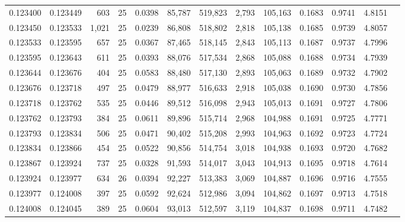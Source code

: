 \begin{tabular}{rrrrrrrrrrrrr}
0.123400 & 0.123449 &   603 &  25 &                                     0.0398 &  85,787 & 519,823 &   2,793 & 105,163 & 0.1683 & 0.9741 & 4.8151 \\
0.123450 & 0.123533 & 1,021 &  25 &                                     0.0239 &  86,808 & 518,802 &   2,818 & 105,138 & 0.1685 & 0.9739 & 4.8057 \\
0.123533 & 0.123595 &   657 &  25 &                                     0.0367 &  87,465 & 518,145 &   2,843 & 105,113 & 0.1687 & 0.9737 & 4.7996 \\
0.123595 & 0.123643 &   611 &  25 &                                     0.0393 &  88,076 & 517,534 &   2,868 & 105,088 & 0.1688 & 0.9734 & 4.7939 \\
0.123644 & 0.123676 &   404 &  25 &                                     0.0583 &  88,480 & 517,130 &   2,893 & 105,063 & 0.1689 & 0.9732 & 4.7902 \\
0.123676 & 0.123718 &   497 &  25 &                                     0.0479 &  88,977 & 516,633 &   2,918 & 105,038 & 0.1690 & 0.9730 & 4.7856 \\
0.123718 & 0.123762 &   535 &  25 &                                     0.0446 &  89,512 & 516,098 &   2,943 & 105,013 & 0.1691 & 0.9727 & 4.7806 \\
0.123762 & 0.123793 &   384 &  25 &                                     0.0611 &  89,896 & 515,714 &   2,968 & 104,988 & 0.1691 & 0.9725 & 4.7771 \\
0.123793 & 0.123834 &   506 &  25 &                                     0.0471 &  90,402 & 515,208 &   2,993 & 104,963 & 0.1692 & 0.9723 & 4.7724 \\
0.123834 & 0.123866 &   454 &  25 &                                     0.0522 &  90,856 & 514,754 &   3,018 & 104,938 & 0.1693 & 0.9720 & 4.7682 \\
0.123867 & 0.123924 &   737 &  25 &                                     0.0328 &  91,593 & 514,017 &   3,043 & 104,913 & 0.1695 & 0.9718 & 4.7614 \\
0.123924 & 0.123977 &   634 &  26 &                                     0.0394 &  92,227 & 513,383 &   3,069 & 104,887 & 0.1696 & 0.9716 & 4.7555 \\
0.123977 & 0.124008 &   397 &  25 &                                     0.0592 &  92,624 & 512,986 &   3,094 & 104,862 & 0.1697 & 0.9713 & 4.7518 \\
0.124008 & 0.124045 &   389 &  25 &                                     0.0604 &  93,013 & 512,597 &   3,119 & 104,837 & 0.1698 & 0.9711 & 4.7482 \\

\end{tabular}

